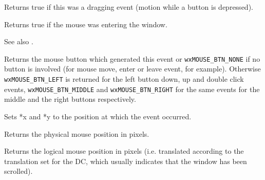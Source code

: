 \label{wxmouseeventdragging}


Returns true if this was a dragging event (motion while a button is depressed).



\label{wxmouseevententering}


Returns true if the mouse was entering the window.

See also .

\label{wxmouseeventgetbutton}


Returns the mouse button which generated this event or {\tt wxMOUSE\_BTN\_NONE} 
if no button is involved (for mouse move, enter or leave event, for example).
Otherwise {\tt wxMOUSE\_BTN\_LEFT} is returned for the left button down, up and
double click events, {\tt wxMOUSE\_BTN\_MIDDLE} and {\tt wxMOUSE\_BTN\_RIGHT} 
for the same events for the middle and the right buttons respectively.

\label{wxmouseeventgetposition}




Sets *x and *y to the position at which the event occurred.

Returns the physical mouse position in pixels.

\label{wxmouseeventgetlogicalposition}


Returns the logical mouse position in pixels (i.e. translated according to the
translation set for the DC, which usually indicates that the window has been scrolled).


\label{wxmouseeventgetlinesperaction}

